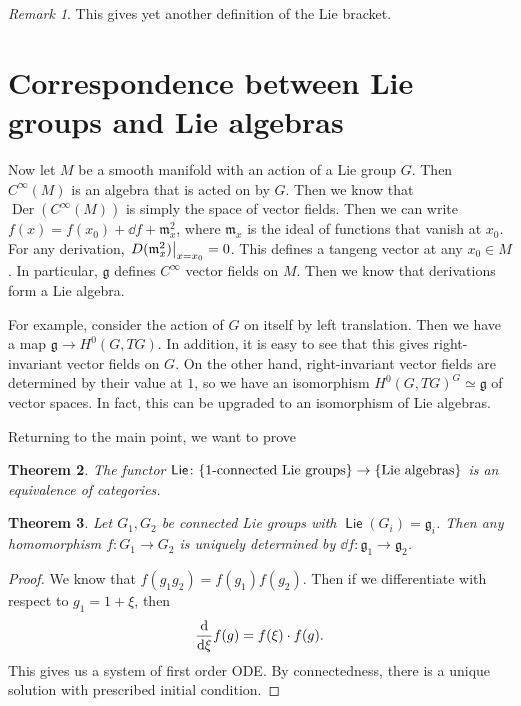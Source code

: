 \documentclass[leqno, openany]{memoir}
\newtheorem{thm}{Theorem}[section]
\theoremstyle{definition}
\theoremstyle{remark}
\newtheorem{rmk}[thm]{Remark}
\theoremstyle{plain}
\theoremstyle{definition}
\theoremstyle{remark}
\newcommand{\mf}[1]{\mathfrak{#1}}
\DeclareMathOperator{\Der}{Der}
\DeclareMathOperator{\Lie}{\mathsf{Lie}}
\begin{document}
\begin{rmk}
    This gives yet another definition of the Lie bracket.
\end{rmk}

\section{Correspondence between Lie groups and Lie algebras}%
\label{sec:correspondence_between_lie_groups_and_lie_algebras}

Now let $M$ be a smooth manifold with an action of a Lie group $G$. Then $C^{\infty}(M)$ is an algebra that is acted on by $G$. Then we know that $\Der(C^{\infty}(M))$ is simply the space of vector fields. Then we can write $f(x) = f(x_0) + \dd f + \mf{m}_x^2$, where $\mf{m}_x$ is the ideal of functions that vanish at $x_0$. For any derivation, $\eval{ D(\mf{m}_x^2)  }_{x = x_0} = 0$. This defines a tangeng vector at any $x_0 \in M$. In particular, $\mf{g}$ defines $C^{\infty}$ vector fields on $M$. Then we know that derivations form a Lie algebra.

For example, consider the action of $G$ on itself by left translation. Then we have a map $\mf{g} \to H^0(G, TG)$. In addition, it is easy to see that this gives right-invariant vector fields on $G$. On the other hand, right-invariant vector fields are determined by their value at $1$, so we have an isomorphism $H^0(G, TG)^G \simeq \mf{g}$ of vector spaces. In fact, this can be upgraded to an isomorphism of Lie algebras.

Returning to the main point, we want to prove
\begin{thm}
    The functor $\Lie \colon \qty{ 1\text{-connected Lie groups} } \to \qty{\text{Lie algebras}}$ is an equivalence of categories.
\end{thm}

\begin{thm}
    Let $G_1, G_2$ be connected Lie groups with $\Lie(G_i) = \mf{g}_i$. Then any homomorphism $f \colon G_1 \to G_2$ is uniquely determined by $\dd f \colon \mf{g}_1 \to \mf{g}_2$. 
\end{thm}

\begin{proof}
    We know that $f(g_1 g_2) = f(g_1) f(g_2)$. Then if we differentiate with respect to $g_1 = 1 + \xi$, then
    \[ \dv{\xi} f(g) = f(\xi) \cdot f(g). \]
    This gives us a system of first order ODE. By connectedness, there is a unique solution with prescribed initial condition.
\end{proof}
\end{document}
